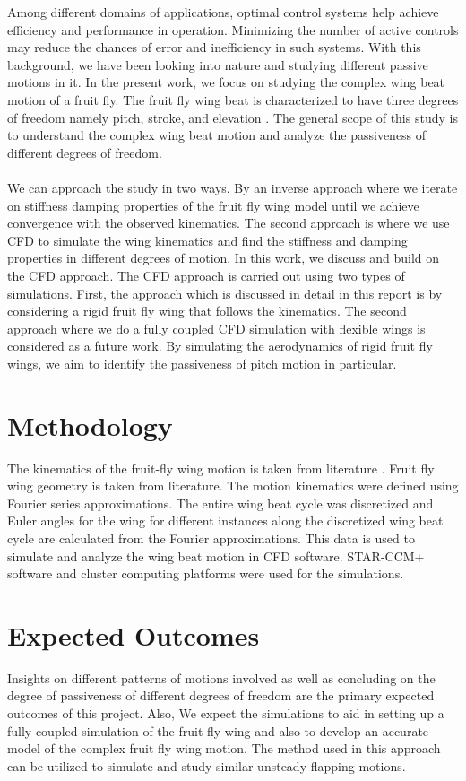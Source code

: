 Among different domains of applications, optimal control systems help achieve efficiency and performance in operation. Minimizing the number of active controls may reduce the chances of error and inefficiency in such systems. With this background, we have been looking into nature and studying different passive motions in it. In the present work, we focus on studying the complex wing beat motion of a fruit fly. The fruit fly wing beat is characterized to have three degrees of freedom namely pitch, stroke, and elevation \cite{kinematics1}. The general scope of this study is to understand the complex wing beat motion and analyze the passiveness of different degrees of freedom.
\\
\\
We can approach the study in two ways. By an inverse approach where we iterate on stiffness damping properties of the fruit fly wing model until we achieve convergence with the observed kinematics. The second approach is where we use CFD to simulate the wing kinematics and find the stiffness and damping properties in different degrees of motion. In this work, we discuss and build on the CFD approach. The CFD approach is carried out using two types of simulations. First, the approach which is discussed in detail in this report is by considering a rigid fruit fly wing that follows the kinematics.
The second approach where we do a fully coupled CFD simulation with flexible wings is considered as a future work. By simulating the aerodynamics of rigid fruit fly wings, we aim to identify the passiveness of pitch motion in particular.


\section{Methodology}
The kinematics of the fruit-fly wing motion is taken from literature \cite{kinematics1,kinematics2}. Fruit fly wing geometry is taken from literature\cite{kinematics1}. The motion kinematics were defined using Fourier series approximations. The entire wing beat cycle was discretized and Euler angles for the wing for different instances along the discretized wing beat cycle are calculated from the Fourier approximations. This data is used to simulate and analyze the wing beat motion in CFD software. STAR-CCM+ software and cluster computing platforms were used for the simulations. 

\section{Expected Outcomes}

Insights on different patterns of motions involved as well as concluding on the degree of passiveness of different degrees of freedom are the primary expected outcomes of this project. Also, We expect the simulations to aid in setting up a fully coupled simulation of the fruit fly wing and also to develop an accurate model of the complex fruit fly wing motion. The method used in this approach can be utilized to simulate and study similar unsteady flapping motions.


